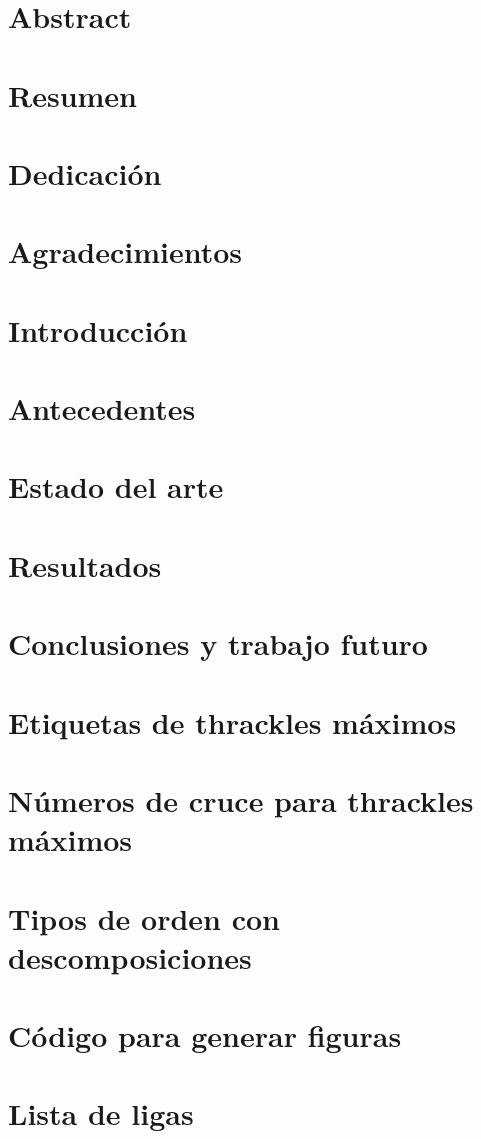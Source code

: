 \documentclass[12pt]{book}
\theoremstyle{definition}
\begin{document}

\chapter*{Abstract}

\chapter*{Resumen}

\chapter*{Dedicación}

\chapter*{Agradecimientos}

\tableofcontents

\chapter{Introducción}

\chapter{Antecedentes}

\chapter{Estado del arte}
\label{cap3}
\chapter{Resultados}\label{cap4}

\chapter{Conclusiones y trabajo futuro}

\appendix
\chapter{Etiquetas de thrackles máximos}

\chapter{Números de cruce para thrackles máximos}

\chapter{Tipos de orden con descomposiciones}

\chapter{Código para generar figuras}

\chapter{Lista de ligas}



\end{document}

